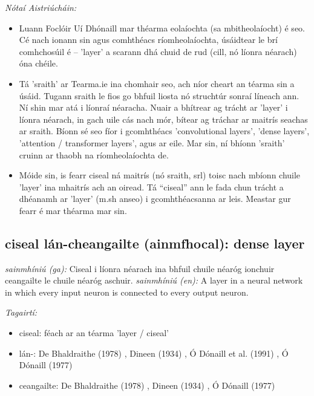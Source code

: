 \documentclass{article}
\begin{document}
 \noindent \textit{Nótaí Aistriúcháin:}
\begin{itemize}
	\item Luann Foclóir Uí Dhónaill mar théarma eolaíochta (sa mbitheolaíocht) é seo. Cé nach ionann sin agus comhthéacs ríomheolaíochta, úsáidtear le brí comhchosúil é -- 'layer' a scarann dhá chuid de rud (cill, nó líonra néarach) óna chéile.
	\item Tá 'sraith' ar Tearma.ie ina chomhair seo, ach níor cheart an téarma sin a úsáid. Tugann sraith le fios go bhfuil liosta nó struchtúr sonraí líneach ann. Ní shin mar atá i líonraí néaracha. Nuair a bhítrear ag trácht ar 'layer' i líonra néarach, in gach uile cás nach mór, bítear ag tráchar ar maitrís seachas ar sraith. Bíonn sé seo fíor i gcomhthéacs 'convolutional layers', 'dense layers', 'attention / transformer layers', agus ar eile. Mar sin, ní bhíonn 'sraith' cruinn ar thaobh na ríomheolaíochta de.
	\item Móide sin, is fearr ciseal ná maitrís (nó sraith, srl) toisc nach mbíonn chuile 'layer' ina mhaitrís ach an oiread. Tá “ciseal” ann le fada chun trácht a dhéanamh ar 'layer' (m.sh anseo) i gcomhthéacsanna ar leis. Meastar gur fearr é mar théarma mar sin.
\end{itemize}


\subsection*{ciseal lán-cheangailte (ainmfhocal): dense layer} 
 \noindent \textit{sainmhíniú (ga):} Ciseal i líonra néarach ina bhfuil chuile néaróg ionchuir ceangailte le chuile néaróg aschuir.
\newline\newline
 \noindent \textit{sainmhíniú (en):} A layer in a neural network in which every input neuron is connected to every output neuron.
\newline

 \noindent \textit{Tagairtí:}
\begin{itemize}
	\item ciseal: féach ar an téarma 'layer / ciseal'
	\item lán-: De Bhaldraithe (1978) \cite{de-bhaldraithe}, Dineen (1934) \cite{dineen}, Ó Dónaill et al. (1991) \cite{focloir-beag}, Ó Dónaill (1977) \cite{odonaill}
	\item ceangailte: De Bhaldraithe (1978) \cite{de-bhaldraithe}, Dineen (1934) \cite{dineen}, Ó Dónaill (1977) \cite{odonaill}
\end{itemize}
\end{document}
